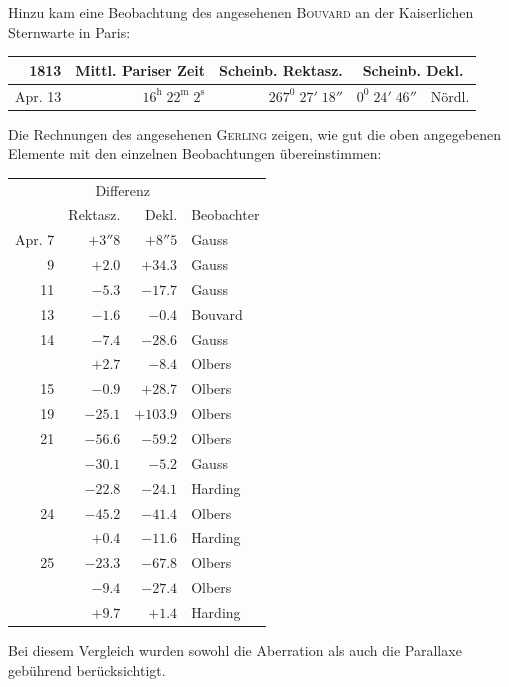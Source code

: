 Hinzu kam eine Beobachtung des angesehenen \textsc{Bouvard} an der Kaiserlichen Sternwarte in Paris:
\begin{center}\small\setlength{\tabcolsep}{4pt}
\begin{tabular}{r|r|r|r l}
1813&Mittl. Pariser Zeit&Scheinb. Rektasz.&\multicolumn{2}{c}{Scheinb. Dekl.}\\\hline
Apr. 13&$16^{\mathrm h}\;22^{\mathrm m}\;2^{\mathrm s}$&$267^0\;27'\;18''$&$0^0\;24'\;46''$&Nördl.
\end{tabular}\end{center}

Die Rechnungen des angesehenen \textsc{Gerling} zeigen, wie gut die oben angegebenen Elemente mit den einzelnen Beobachtungen übereinstimmen:
\begin{center}\small\setlength{\tabcolsep}{6pt}
\begin{tabular}{r|r|r|l}
&\multicolumn{2}{c|}{Differenz}&\\
&Rektasz.&Dekl.&Beobachter\\\hline
Apr. 7&$+3''8$&$+8''5$&Gauss\\
9&$+2.0$&$+34.3$&Gauss\\
11&$-5.3$&$-17.7$&Gauss\\
13&$-1.6$&$-0.4$&Bouvard\\
14&$-7.4$&$-28.6$&Gauss\\
&$+2.7$&$-8.4$&Olbers\\
15&$-0.9$&$+28.7$&Olbers\\
19&$-25.1$&$+103.9$&Olbers\\
21&$-56.6$&$-59.2$&Olbers\\
&$-30.1$&$-5.2$&Gauss\\
&$-22.8$&$-24.1$&Harding\\
24&$-45.2$&$-41.4$&Olbers\\
&$+0.4$&$-11.6$&Harding\\
25&$-23.3$&$-67.8$&Olbers\\
&$-9.4$&$-27.4$&Olbers\\
&$+9.7$&$+1.4$&Harding
\end{tabular}\end{center}

Bei diesem Vergleich wurden sowohl die Aberration als auch die Parallaxe gebührend berücksichtigt.
\par\nobreak\smallskip
\noindent\makebox[\linewidth][c]{\rule{.225\linewidth}{.3pt}}\par\medskip

